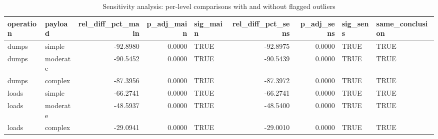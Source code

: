 \begin{table}[ht]
\centering
\begin{tabular}{llrrlrrll}
  \toprule
operation & payload & rel\_diff\_pct\_main & p\_adj\_main & sig\_main & rel\_diff\_pct\_sens & p\_adj\_sens & sig\_sens & same\_conclusion \\ 
  \midrule
dumps & simple & -92.8980 & 0.0000 & TRUE & -92.8975 & 0.0000 & TRUE & TRUE \\ 
  dumps & moderate & -90.5452 & 0.0000 & TRUE & -90.5439 & 0.0000 & TRUE & TRUE \\ 
  dumps & complex & -87.3956 & 0.0000 & TRUE & -87.3972 & 0.0000 & TRUE & TRUE \\ 
  loads & simple & -66.2741 & 0.0000 & TRUE & -66.2741 & 0.0000 & TRUE & TRUE \\ 
  loads & moderate & -48.5937 & 0.0000 & TRUE & -48.5400 & 0.0000 & TRUE & TRUE \\ 
  loads & complex & -29.0941 & 0.0000 & TRUE & -29.0010 & 0.0000 & TRUE & TRUE \\ 
   \bottomrule
\end{tabular}
\caption{Sensitivity analysis: per-level comparisons with and without flagged outliers} 
\label{tab:sens_pairwise}
\end{table}
